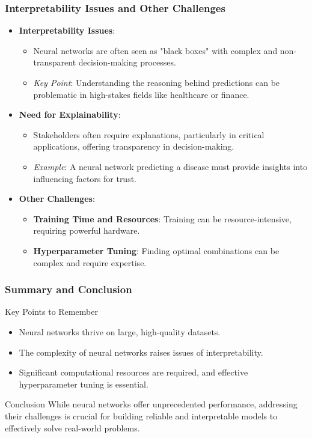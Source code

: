 \documentclass[aspectratio=169]{beamer}
\begin{document}
\begin{frame}[fragile]
    \frametitle{Interpretability Issues and Other Challenges}
    \begin{itemize}
        \item \textbf{Interpretability Issues}:
        \begin{itemize}
            \item Neural networks are often seen as "black boxes" with complex and non-transparent decision-making processes.
            \item \textit{Key Point}: Understanding the reasoning behind predictions can be problematic in high-stakes fields like healthcare or finance.
        \end{itemize}
        
        \item \textbf{Need for Explainability}:
        \begin{itemize}
            \item Stakeholders often require explanations, particularly in critical applications, offering transparency in decision-making.
            \item \textit{Example}: A neural network predicting a disease must provide insights into influencing factors for trust.
        \end{itemize}

        \item \textbf{Other Challenges}:
        \begin{itemize}
            \item \textbf{Training Time and Resources}: Training can be resource-intensive, requiring powerful hardware.
            \item \textbf{Hyperparameter Tuning}: Finding optimal combinations can be complex and require expertise.
        \end{itemize}
    \end{itemize}
\end{frame}

\begin{frame}[fragile]
    \frametitle{Summary and Conclusion}
    \begin{block}{Key Points to Remember}
        \begin{itemize}
            \item Neural networks thrive on large, high-quality datasets.
            \item The complexity of neural networks raises issues of interpretability.
            \item Significant computational resources are required, and effective hyperparameter tuning is essential.
        \end{itemize}
    \end{block}
    
    \begin{block}{Conclusion}
        While neural networks offer unprecedented performance, addressing their challenges is crucial for building reliable and interpretable models to effectively solve real-world problems.
    \end{block}
\end{frame}
\end{document}
